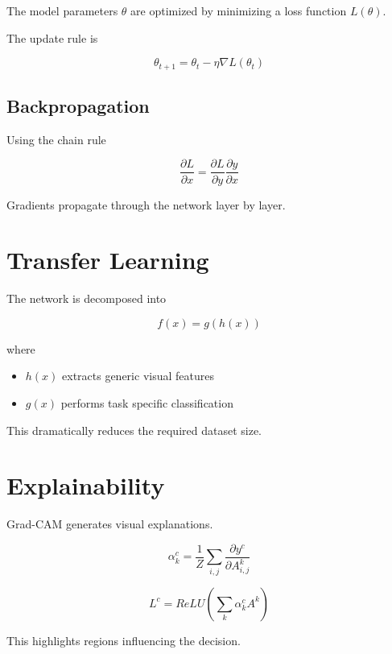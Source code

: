 ﻿\documentclass[11pt]{article}
\begin{document}
The model parameters $\theta$ are optimized by minimizing
a loss function $L(\theta)$.

The update rule is

\[
\theta_{t+1} =
\theta_t - \eta \nabla L(\theta_t)
\]

\subsection{Backpropagation}

Using the chain rule

\[
\frac{\partial L}{\partial x}
=
\frac{\partial L}{\partial y}
\frac{\partial y}{\partial x}
\]

Gradients propagate through the network
layer by layer.

\section{Transfer Learning}

The network is decomposed into

\[
f(x) = g(h(x))
\]

where

\begin{itemize}
\item $h(x)$ extracts generic visual features
\item $g(x)$ performs task specific classification
\end{itemize}

This dramatically reduces the required dataset size.

\section{Explainability}

Grad-CAM generates visual explanations.

\[
\alpha_k^c =
\frac{1}{Z}
\sum_{i,j}
\frac{\partial y^c}{\partial A_{i,j}^k}
\]

\[
L^c =
ReLU
\left(
\sum_k \alpha_k^c A^k
\right)
\]

This highlights regions influencing the decision.
\end{document}
